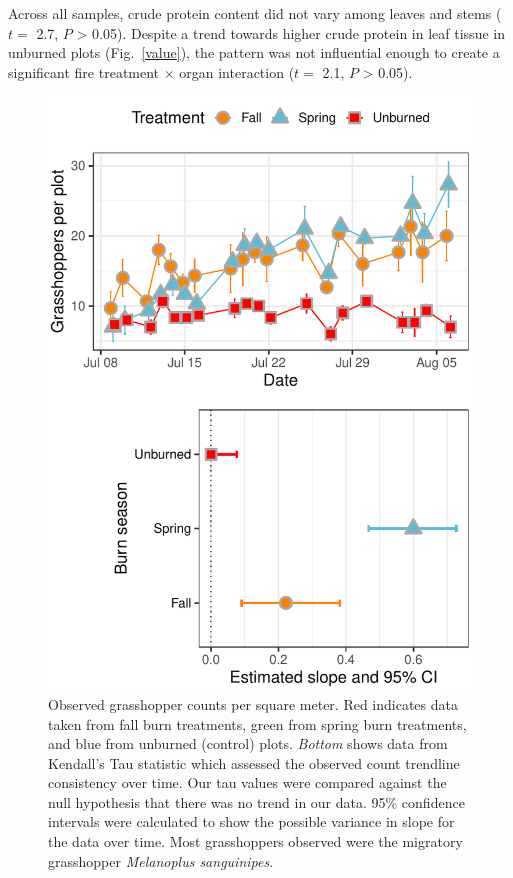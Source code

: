 \documentclass[referee, 
	            sn-basic]
           {sn-jnl}
\begin{document}
\begin{linenumbers}
Across all samples, crude protein content did not vary among leaves and
stems (\(t =\) 2.7, \(P\) \textgreater{} 0.05). Despite a trend towards
higher crude protein in leaf tissue in unburned plots (Fig.~\ref{value}), the
pattern was not influential enough to create a significant fire
treatment \(\times\) organ interaction (\(t =\) 2.1, \(P\)
\textgreater{} 0.05).

\begin{figure}
\centering
\includegraphics{tau_gg-1.pdf}
\caption{Observed grasshopper counts per square meter. 
Red indicates data taken from fall burn treatments, green from spring burn treatments, and blue from unburned (control) plots.
\emph{Bottom} shows data from Kendall's Tau statistic which assessed the observed count trendline consistency over time. 
Our tau values were compared against the null hypothesis that there was no trend in our data. 
95\% confidence intervals were calculated to show the possible variance in slope for the data over time. 
Most grasshoppers observed were the migratory grasshopper \emph{Melanoplus sanguinipes}.}
\label{tau} %
\end{figure}


\end{linenumbers}
\end{document}
